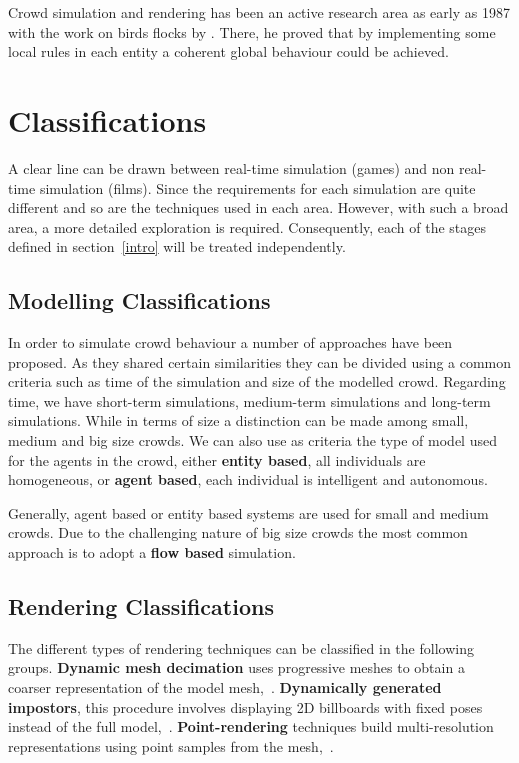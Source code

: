 \documentclass[11pt,twocolumn]{article}
\numberwithin{equation}{section} %
\numberwithin{figure}{section} %
\numberwithin{table}{section} %
\begin{document}
Crowd simulation and rendering has been an active research area as early as 1987 with the work on birds flocks by \cite{Reynolds1987}.
There, he proved that by implementing some local rules in each entity a coherent global behaviour could be achieved.

\section{Classifications}

A clear line can be drawn between real-time simulation (games) and non real-time simulation (films).
Since the requirements for each simulation are quite different and so are the techniques used in each area.
However, with such a broad area, a more detailed exploration is required.
Consequently, each of the stages defined in section~\ref{intro} will be treated independently.

\subsection{Modelling Classifications}

In order to simulate crowd behaviour a number of approaches have been proposed.
As they shared certain similarities they can be divided using a common criteria such as time of the simulation and size of the modelled crowd.
Regarding time, we have short-term simulations, medium-term simulations and long-term simulations.
While in terms of size a distinction can be made among small, medium and big size crowds.
We can also use as criteria the type of model used for the agents in the crowd, either \textbf{entity based}, all individuals are homogeneous, or \textbf{agent based}, each individual is intelligent and autonomous.

Generally, agent based or entity based systems are used for small and medium crowds.
Due to the challenging nature of big size crowds the most common approach is to adopt a \textbf{flow based} simulation.

\subsection{Rendering Classifications}

The different types of rendering techniques can be classified in the following groups.
\textbf{Dynamic mesh decimation} uses progressive meshes to obtain a coarser representation of the model mesh,~\cite{Hoppe1996}.
\textbf{Dynamically generated impostors}, this procedure involves displaying 2D billboards with fixed poses instead of the full model,~\cite{Aubel2000}.
\textbf{Point-rendering} techniques build multi-resolution representations using point samples from the mesh,~\cite{Wand2002}.
\end{document}
